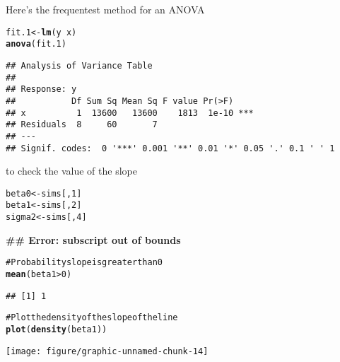 \documentclass[12pt,letterpaper,oneside]{article}\usepackage{graphicx, color}
\makeatletter
\newcommand{\hlfunctioncall}[1]{\textcolor[rgb]{0.501960784313725,0,0.329411764705882}{\textbf{#1}}}%
\newcommand{\hlcomment}[1]{\textcolor[rgb]{0.180392156862745,0.6,0.341176470588235}{#1}}%
\newenvironment{kframe}{%
 \def\at@end@of@kframe{}%
 \ifinner\ifhmode%
  \def\at@end@of@kframe{\end{minipage}}%
  \begin{minipage}{\columnwidth}%
 \fi\fi%
 \def\FrameCommand##1{\hskip\@totalleftmargin \hskip-\fboxsep
 \colorbox{shadecolor}{##1}\hskip-\fboxsep
     \hskip-\linewidth \hskip-\@totalleftmargin \hskip\columnwidth}%
 \MakeFramed {\advance\hsize-\width
   \@totalleftmargin\z@ \linewidth\hsize
   \@setminipage}}%
 {\par\unskip\endMakeFramed%
 \at@end@of@kframe}
\newenvironment{knitrout}{}{} %
\makeatother
\begin{document}
Here's the frequentest method for an ANOVA
\begin{knitrout}\scriptsize
{}\color{fgcolor}\begin{kframe}
\begin{alltt}
fit.1 <- \hlfunctioncall{lm}(y ~ x)
\hlfunctioncall{anova}(fit.1)
\end{alltt}
\begin{verbatim}
## Analysis of Variance Table
## 
## Response: y
##           Df Sum Sq Mean Sq F value Pr(>F)    
## x          1  13600   13600    1813  1e-10 ***
## Residuals  8     60       7                   
## ---
## Signif. codes:  0 '***' 0.001 '**' 0.01 '*' 0.05 '.' 0.1 ' ' 1
\end{verbatim}
\end{kframe}
\end{knitrout}


to check the value of the slope
\begin{knitrout}\scriptsize
{}\color{fgcolor}\begin{kframe}
\begin{alltt}
beta0 <- sims[, 1]
beta1 <- sims[, 2]
sigma2 <- sims[, 4]
\end{alltt}


{\ttfamily\noindent\bfseries\textcolor{errorcolor}{\#\# Error: subscript out of bounds}}\begin{alltt}

\hlcomment{# Probability slope is greater than 0}
\hlfunctioncall{mean}(beta1 > 0)
\end{alltt}
\begin{verbatim}
## [1] 1
\end{verbatim}
\begin{alltt}

\hlcomment{# Plot the density of the slope of the line}
\hlfunctioncall{plot}(\hlfunctioncall{density}(beta1))
\end{alltt}
\end{kframe}

{\centering \texttt{[image: figure/graphic-unnamed-chunk-14]} 

}



\end{knitrout}
\end{document}
